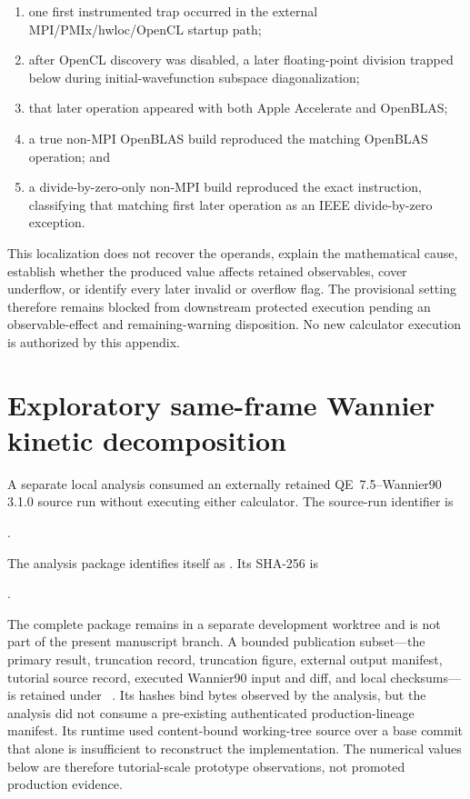 \begin{enumerate}
  \item one first instrumented trap occurred in the external
        MPI/PMIx/hwloc/OpenCL startup path;
  \item after OpenCL discovery was disabled, a later floating-point division
        trapped below  during initial-wavefunction subspace
        diagonalization;
  \item that later operation appeared with both Apple Accelerate and OpenBLAS;
  \item a true non-MPI OpenBLAS build reproduced the matching OpenBLAS
         operation; and
  \item a divide-by-zero-only non-MPI build reproduced the exact instruction,
        classifying that matching first later operation as an IEEE
        divide-by-zero exception.
\end{enumerate}

This localization does not recover the operands, explain the mathematical
cause, establish whether the produced value affects retained observables,
cover underflow, or identify every later invalid or overflow flag. The
provisional setting therefore remains blocked from downstream protected
execution pending an observable-effect and remaining-warning disposition. No
new calculator execution is authorized by this appendix.

\section{Exploratory same-frame Wannier kinetic decomposition}

A separate local analysis consumed an externally retained QE~7.5--Wannier90
3.1.0 source run without executing either calculator. The source-run identifier
is
\begin{center}
\small{}.
\end{center}
The analysis package identifies itself as
. Its
 SHA-256 is
\begin{center}
\small{}.
\end{center}
The complete package remains in a separate development worktree and is not part
of the present manuscript branch. A bounded publication subset---the primary
result, truncation record, truncation figure, external output manifest, tutorial
source record, executed Wannier90 input and diff, and local checksums---is
retained under
\
. Its hashes bind bytes observed by the
analysis, but the analysis did not consume a pre-existing authenticated
production-lineage manifest. Its runtime used content-bound working-tree source
over a base commit that alone is insufficient to reconstruct the
implementation. The numerical values below are therefore tutorial-scale
prototype observations, not promoted production evidence.

